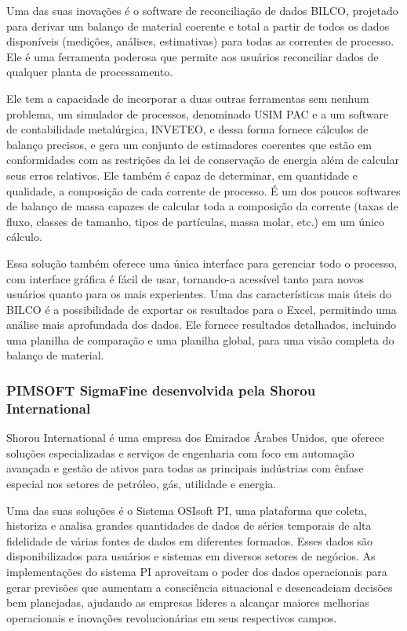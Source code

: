 Uma das suas inovações é o software de reconciliação de dados BILCO, projetado para derivar um balanço de material coerente e total a partir de todos os dados disponíveis (medições, análises, estimativas) para todas as correntes de processo. Ele é uma ferramenta poderosa que permite aos usuários reconciliar dados de qualquer planta de processamento.

Ele tem a capacidade de incorporar a duas outras ferramentas sem nenhum problema, um simulador de processos, denominado USIM PAC e a um software de contabilidade metalúrgica, INVETEO, e dessa forma fornece cálculos de balanço precisos, e gera um conjunto de estimadores coerentes que estão em conformidades com as restrições da lei de conservação de energia além de calcular seus erros relativos. Ele também é capaz de determinar, em quantidade e qualidade, a composição de cada corrente de processo. É um dos poucos softwares de balanço de massa capazes de calcular toda a composição da corrente (taxas de fluxo, classes de tamanho, tipos de partículas, massa molar, etc.) em um único cálculo.

Essa solução também oferece uma única interface para gerenciar todo o processo, com interface gráfica é fácil de usar, tornando-a acessível tanto para novos usuários quanto para os mais experientes. Uma das características mais úteis do BILCO é a possibilidade de exportar os resultados para o Excel, permitindo uma análise mais aprofundada dos dados. Ele fornece resultados detalhados, incluindo uma planilha de comparação e uma planilha global, para uma visão completa do balanço de material.

\subsubsection{PIMSOFT SigmaFine desenvolvida pela Shorou International}

Shorou International é uma empresa dos Emirados Árabes Unidos, que oferece soluções especializadas e serviços de engenharia com foco em automação avançada e gestão de ativos para todas as principais indústrias com ênfase especial nos setores de petróleo, gás, utilidade e energia.

Uma das suas soluções é o Sistema OSIsoft PI, uma plataforma que coleta, historiza e analisa grandes quantidades de dados de séries temporais de alta fidelidade de várias fontes de dados em diferentes formados. Esses dados são disponibilizados para usuários e sistemas em diversos setores de negócios. As implementações do sistema PI aproveitam o poder dos dados operacionais para gerar previsões que aumentam a consciência situacional e desencadeiam decisões bem planejadas, ajudando as empresas líderes a alcançar maiores melhorias operacionais e inovações revolucionárias em seus respectivos campos. 


